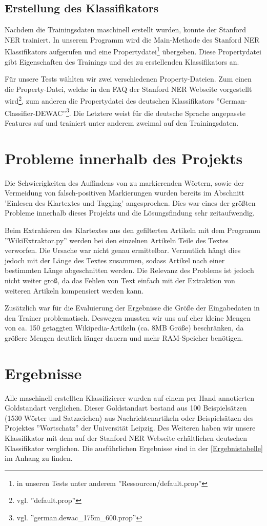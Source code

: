 \documentclass[a4paper]{article}
\begin{document}
	\subsection{Erstellung des Klassifikators}
		Nachdem die Trainingsdaten maschinell erstellt wurden, konnte der Stanford NER trainiert.
		In unserem Programm wird die Main-Methode des Stanford NER Klassifikators aufgerufen und eine Propertydatei\footnote{in unseren Tests unter anderem ''Ressourcen/default.prop''} übergeben.
		Diese Propertydatei gibt Eigenschaften des Trainings und des zu erstellenden Klassifikators an.

		Für unsere Tests wählten wir zwei verschiedenen Property-Dateien.
		Zum einen die Property-Datei, welche in den FAQ der Stanford NER Webseite vorgestellt wird\footnote{vgl. ''default.prop''}, zum anderen die Propertydatei des deutschen Klassifikators ''German-Classifier-DEWAC''\footnote{vgl. ''german.dewac\_175m\_600.prop''}.
		Die Letztere weist für die deutsche Sprache angepasste Features auf und trainiert unter anderem zweimal auf den Trainingsdaten.

\section{Probleme innerhalb des Projekts}
\label{Probleme}
	Die Schwierigkeiten des Auffindens von zu markierenden Wörtern, sowie der Vermeidung von falsch-positiven Markierungen wurden bereits im Abschnitt 'Einlesen des Klartextes und Tagging' angesprochen. Dies war eines der größten Probleme innerhalb dieses Projekts und die Lösungsfindung sehr zeitaufwendig.

	Beim Extrahieren des Klartextes aus den gefilterten Artikeln mit dem Programm ''WikiExtraktor.py'' werden bei den einzelnen Artikeln Teile des Textes verworfen.
	Die Ursache war nicht genau ermittelbar. Vermutlich hängt dies jedoch mit der Länge des Textes zusammen, sodass Artikel nach einer bestimmten Länge abgeschnitten werden. Die Relevanz des Problems ist jedoch nicht weiter groß, da das Fehlen von Text einfach mit der Extraktion von weiteren Artikeln kompensiert werden kann.
	
	Zusätzlich war für die Evaluierung der Ergebnisse die Größe der Eingabedaten in den Trainer problematisch. Deswegen mussten wir uns auf eher kleine Mengen von ca. 150 getaggten Wikipedia-Artikeln (ca. 8MB Größe) beschränken, da größere Mengen deutlich länger dauern und mehr RAM-Speicher benötigen.
\section{Ergebnisse}
	Alle maschinell erstellten Klassifizierer wurden auf einem per Hand annotierten Goldstandart verglichen.
	Dieser Goldstandart bestand aus 100 Beispielsätzen (1530 Wörter und Satzzeichen) aus Nachrichtenartikeln oder Beispielsätzen des Projektes ''Wortschatz'' der Universität Leipzig.
	Des Weiteren haben wir unsere Klassifikator mit dem auf der Stanford NER Webseite erhältlichen deutschen Klassifikator verglichen.
	Die ausführlichen Ergebnisse sind in der \autoref{Ergebnistabelle} im Anhang zu finden.
\end{document}
